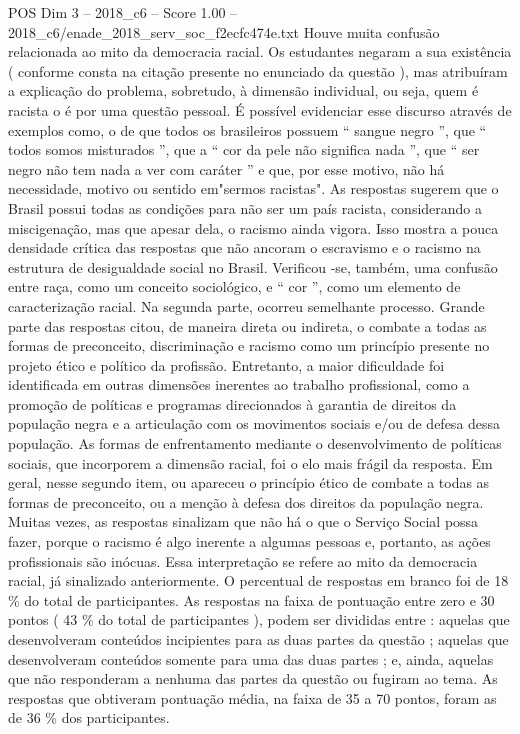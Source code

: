 \begin{textsample}{POS Dim 3 – 2018\_c6 – Score 1.00 – 2018\_c6/enade\_2018\_serv\_soc\_f2ecfc474e.txt}
Houve muita confusão relacionada ao mito da democracia racial.
Os estudantes negaram a sua existência ( conforme consta na citação presente no enunciado da questão ), mas atribuíram a explicação do problema, sobretudo, à dimensão individual, ou seja, quem é racista o é por uma questão pessoal.
É possível evidenciar esse discurso através de exemplos como, o de que todos os brasileiros possuem “ sangue negro ”, que “ todos somos misturados ”, que a “ cor da pele não significa nada ”, que “ ser negro não tem nada a ver com caráter ” e que, por esse motivo, não há necessidade, motivo ou sentido em"sermos racistas".
As respostas sugerem que o Brasil possui todas as condições para não ser um país racista, considerando a miscigenação, mas que apesar dela, o racismo ainda vigora.
Isso mostra a pouca densidade crítica das respostas que não ancoram o escravismo e o racismo na estrutura de desigualdade social no Brasil.
Verificou -se, também, uma confusão entre raça, como um conceito sociológico, e “ cor ”, como um elemento de caracterização racial.
Na segunda parte, ocorreu semelhante processo.
Grande parte das respostas citou, de maneira direta ou indireta, o combate a todas as formas de preconceito, discriminação e racismo como um princípio presente no projeto ético e político da profissão.
Entretanto, a maior dificuldade foi identificada em outras dimensões inerentes ao trabalho profissional, como a promoção de políticas e programas direcionados à garantia de direitos da população negra e a articulação com os movimentos sociais e/ou de defesa dessa população.
As formas de enfrentamento mediante o desenvolvimento de políticas sociais, que incorporem a dimensão racial, foi o elo mais frágil da resposta.
Em geral, nesse segundo item, ou apareceu o princípio ético de combate a todas as formas de preconceito, ou a menção à defesa dos direitos da população negra.
Muitas vezes, as respostas sinalizam que não há o que o Serviço Social possa fazer, porque o racismo é algo inerente a algumas pessoas e, portanto, as ações profissionais são inócuas.
Essa interpretação se refere ao mito da democracia racial, já sinalizado anteriormente.
O percentual de respostas em branco foi de 18 \% do total de participantes.
As respostas na faixa de pontuação entre zero e 30 pontos ( 43 \% do total de participantes ), podem ser divididas entre : aquelas que desenvolveram conteúdos incipientes para as duas partes da questão ; aquelas que desenvolveram conteúdos somente para uma das duas partes ; e, ainda, aquelas que não responderam a nenhuma das partes da questão ou fugiram ao tema.
As respostas que obtiveram pontuação média, na faixa de 35 a 70 pontos, foram as de 36 \% dos participantes.

\end{textsample}
